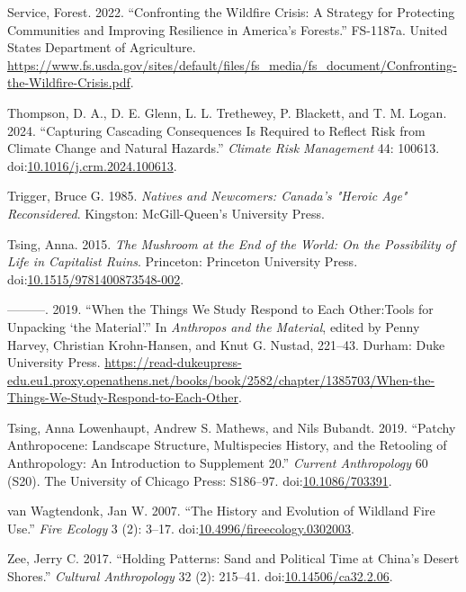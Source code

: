 \documentclass[
]{article}
\newlength{\cslhangindent}
\newenvironment{CSLReferences}[2] %
 {\begin{list}{}{%
  \setlength{\itemindent}{0pt}
  \setlength{\leftmargin}{0pt}
  \setlength{\parsep}{0pt}
  \ifodd #1
   \setlength{\leftmargin}{\cslhangindent}
   \setlength{\itemindent}{-1\cslhangindent}
  \fi
  \setlength{\itemsep}{#2\baselineskip}}}
 {\end{list}}
\begin{document}
\begin{CSLReferences}{1}{0}
Service, Forest. 2022. {``Confronting the {Wildfire Crisis}: {A Strategy} for {Protecting Communities} and {Improving Resilience} in {America}'s {Forests}.''} FS-1187a. United States Department of Agriculture. \url{https://www.fs.usda.gov/sites/default/files/fs_media/fs_document/Confronting-the-Wildfire-Crisis.pdf}.

Thompson, D. A., D. E. Glenn, L. L. Trethewey, P. Blackett, and T. M. Logan. 2024. {``Capturing Cascading Consequences Is Required to Reflect Risk from Climate Change and Natural Hazards.''} \emph{Climate Risk Management} 44: 100613. doi:\href{https://doi.org/10.1016/j.crm.2024.100613}{10.1016/j.crm.2024.100613}.

Trigger, Bruce G. 1985. \emph{Natives and Newcomers: {Canada}'s "{Heroic Age}" Reconsidered}. Kingston: McGill-Queen's University Press.

Tsing, Anna. 2015. \emph{The {Mushroom} at the {End} of the {World}: {On} the {Possibility} of {Life} in {Capitalist Ruins}}. Princeton: Princeton University Press. doi:\href{https://doi.org/10.1515/9781400873548-002}{10.1515/9781400873548-002}.

---------. 2019. {``When the {Things We Study Respond} to {Each Other}:{Tools} for {Unpacking} {`the {Material}'}.''} In \emph{Anthropos and the {Material}}, edited by Penny Harvey, Christian Krohn-Hansen, and Knut G. Nustad, 221--43. Durham: Duke University Press. \url{https://read-dukeupress-edu.eu1.proxy.openathens.net/books/book/2582/chapter/1385703/When-the-Things-We-Study-Respond-to-Each-Other}.

Tsing, Anna Lowenhaupt, Andrew S. Mathews, and Nils Bubandt. 2019. {``Patchy {Anthropocene}: {Landscape Structure}, {Multispecies History}, and the {Retooling} of {Anthropology}: {An Introduction} to {Supplement} 20.''} \emph{Current Anthropology} 60 (S20). The University of Chicago Press: S186--97. doi:\href{https://doi.org/10.1086/703391}{10.1086/703391}.

van Wagtendonk, Jan W. 2007. {``The {History} and {Evolution} of {Wildland Fire Use}.''} \emph{Fire Ecology} 3 (2): 3--17. doi:\href{https://doi.org/10.4996/fireecology.0302003}{10.4996/fireecology.0302003}.

Zee, Jerry C. 2017. {``Holding {Patterns}: {Sand} and {Political Time} at {China}'s {Desert Shores}.''} \emph{Cultural Anthropology} 32 (2): 215--41. doi:\href{https://doi.org/10.14506/ca32.2.06}{10.14506/ca32.2.06}.

\end{CSLReferences}
\end{document}
